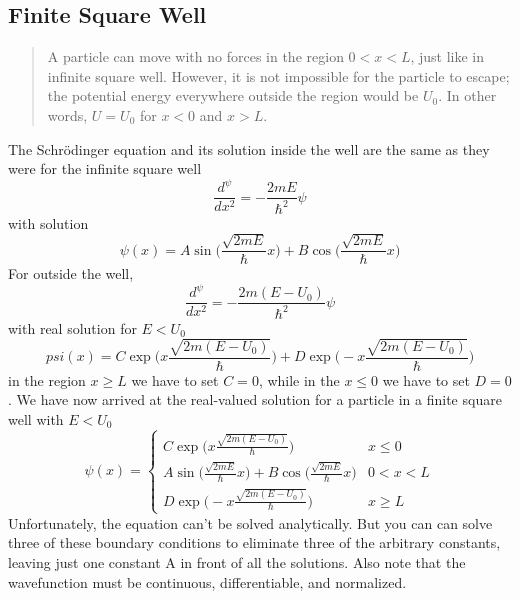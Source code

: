 \documentclass[../../../main.tex]{subfiles}
\begin{document}
\subsection{Finite Square Well}
\begin{quote}
    A particle can move with no forces in the region $0 < x < L$, just like in infinite square well. However, it is not impossible for the particle to escape; the potential energy everywhere outside the region would be $U_0$. In other words, $U=U_0$ for $x < 0$ and $x > L$.
\end{quote} 
The Schrödinger equation and its solution inside the well are the same as they were for the
infinite square well 
\begin{equation*}
    \frac{d^\psi}{dx^2}=-\frac{2mE}{\hbar^2}\psi
\end{equation*}
with solution
\begin{equation*}
    \psi(x)=A\sin \biggl(\frac{\sqrt{2mE}}{\hbar} x\biggr)+ B \cos \biggl(\frac{\sqrt{2mE}}{\hbar} x\biggr)
\end{equation*}
For outside the well,
\begin{equation*}
    \frac{d^\psi}{dx^2}=-\frac{2m(E-U_0)}{\hbar^2}\psi
\end{equation*}
with real solution for $E < U_0$
\begin{equation*}
    psi(x)=C\exp\biggl( x{\frac{\sqrt{2m(E-U_0)}}{\hbar}} \biggr)+D\exp\biggl( -x{\frac{\sqrt{2m(E-U_0)}}{\hbar}} \biggr)
\end{equation*}
in the region $x \geq L$ we have to set $C = 0$, while in the $x \leq 0$ we have to set $D = 0$.  We have now arrived at the real-valued solution for a particle in a finite square well with $E < U_0$
\begin{equation*}
    \psi(x)=\begin{cases}
        C\exp\biggl( x{\frac{\sqrt{2m(E-U_0)}}{\hbar}} \biggr)&x\leq 0\\
        A\sin \biggl(\frac{\sqrt{2mE}}{\hbar} x\biggr)+ B \cos \biggl(\frac{\sqrt{2mE}}{\hbar} x\biggr)& 0 < x < L\\
        D\exp\biggl( -x{\frac{\sqrt{2m(E-U_0)}}{\hbar}} \biggr)&x\geq L
    \end{cases}
\end{equation*}
Unfortunately, the equation can't be solved analytically. But you can can solve three of these boundary conditions to eliminate three of the arbitrary constants, leaving just one constant A in front of all the solutions. Also note that the wavefunction must be continuous, differentiable, and normalized.
\end{document}
